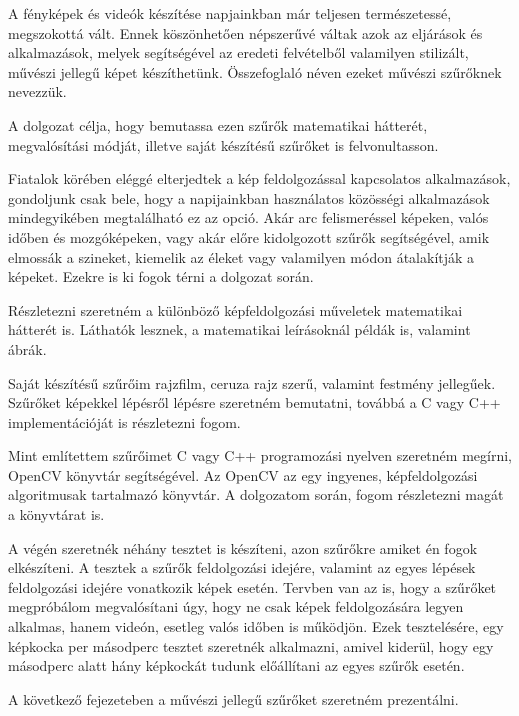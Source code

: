 

A fényképek és videók készítése napjainkban már teljesen természetessé, megszokottá vált. Ennek köszönhetően népszerűvé váltak azok az eljárások és alkalmazások, melyek segítségével az eredeti felvételből valamilyen stilizált, művészi jellegű képet készíthetünk. Összefoglaló néven ezeket művészi szűrőknek nevezzük.

A dolgozat célja, hogy bemutassa ezen szűrők matematikai hátterét, megvalósítási módját, illetve saját készítésű szűrőket is felvonultasson.

Fiatalok körében eléggé elterjedtek a kép feldolgozással kapcsolatos alkalmazások, gondoljunk csak bele, hogy a napijainkban használatos közösségi alkalmazások mindegyikében megtalálható ez az opció. Akár arc felismeréssel képeken, valós időben és mozgóképeken, vagy akár előre kidolgozott szűrők segítségével, amik elmossák a szineket, kiemelik az éleket vagy valamilyen módon átalakítják a képeket. Ezekre is ki fogok térni a dolgozat során.

Részletezni szeretném a különböző képfeldolgozási műveletek matematikai hátterét is. Láthatók lesznek, a matematikai leírásoknál példák is, valamint ábrák.

Saját készítésű szűrőim rajzfilm, ceruza rajz szerű, valamint festmény jellegűek. Szűrőket képekkel lépésről lépésre szeretném bemutatni, továbbá a C vagy C++ implementációját is részletezni fogom.

Mint említettem szűrőimet C vagy C++ programozási nyelven szeretném megírni, OpenCV könyvtár segítségével. Az OpenCV az egy ingyenes, képfeldolgozási algoritmusak tartalmazó könyvtár. A dolgozatom során, fogom részletezni magát a könyvtárat is.

A végén szeretnék néhány tesztet is készíteni, azon szűrőkre amiket én fogok elkészíteni. A tesztek a szűrők feldolgozási idejére, valamint az egyes lépések feldolgozási idejére vonatkozik képek esetén. Tervben van az is, hogy a szűrőket megpróbálom megvalósítani úgy, hogy ne csak képek feldolgozására legyen alkalmas, hanem videón, esetleg valós időben is működjön. Ezek tesztelésére, egy képkocka per másodperc tesztet szeretnék alkalmazni, amivel kiderül, hogy egy másodperc alatt hány képkockát tudunk előállítani az egyes szűrők esetén.

A következő fejezeteben a művészi jellegű szűrőket szeretném prezentálni.
